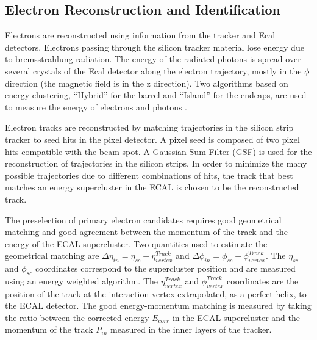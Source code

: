 \subsection{Electron Reconstruction and Identification}


\label{eID}

Electrons are reconstructed using information from the  tracker and Ecal detectors. Electrons
passing through the  silicon tracker material lose energy due to bremsstrahlung  radiation. The
energy of the radiated photons is spread  over several crystals of the Ecal detector along the 
electron trajectory, mostly in the $\phi$ direction  (the magnetic field is in the z direction).
Two algorithms  based on energy clustering, ``Hybrid'' for the barrel and  ``Island'' for the
endcaps, are used to measure the energy  of electrons and photons \cite{eRecoCMS}.

Electron tracks are reconstructed by matching trajectories  in the silicon strip tracker to seed
hits in the pixel  detector. A pixel seed is composed of two pixel hits  compatible with the beam
spot. A Gaussian Sum Filter (GSF)  is used for the reconstruction of trajectories in the  silicon
strips. In order to minimize the many possible  trajectories due to different combinations of hits,
the  track that best matches an energy supercluster in the ECAL  is chosen to be the reconstructed
track.

The preselection of primary electron candidates requires  good geometrical matching and good
agreement between the  momentum of the track and the energy of the ECAL  supercluster. Two
quantities used to estimate the geometrical matching are $\Delta \eta_{in} = \eta_{sc}
-\eta^{Track}_{vertex}$ and  $\Delta \phi_{in} = \phi_{sc} -\phi^{Track}_{vertex}$. The $\eta_{sc}$
and $\phi_{sc}$ coordinates correspond to  the supercluster position and are measured using an
energy weighted algorithm. The $\eta^{Track}_{vertex}$ and  $\phi^{Track}_{vertex}$ coordinates are
the position of the track at the interaction vertex extrapolated,  as a perfect helix, to the ECAL
detector. The good energy-momentum matching is measured by taking the ratio  between the corrected
energy $E_{corr}$ in the ECAL  supercluster and the momentum of the track $P_{in}$  measured in the
inner layers of the tracker.

